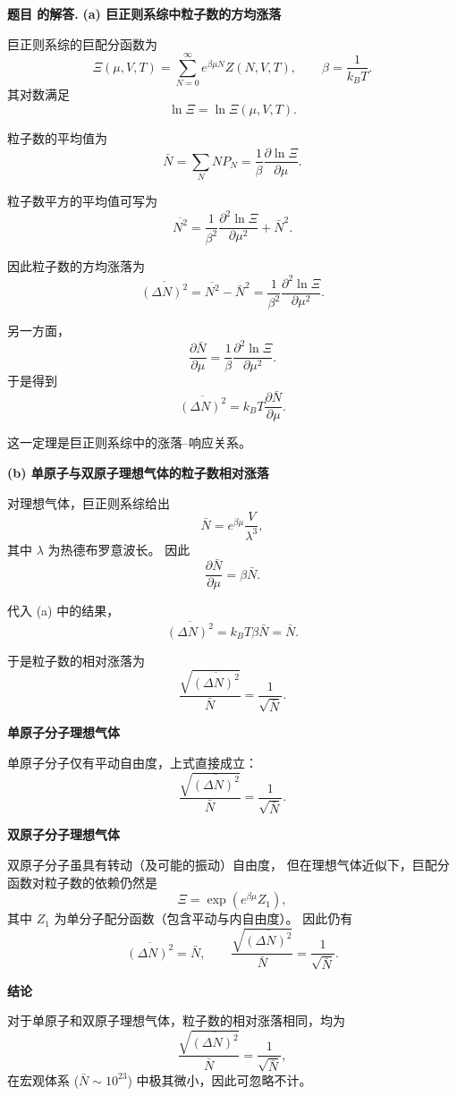 \documentclass[12pt, a4paper, oneside]{ctexart}
\newcounter{problemname}
\newenvironment{solution}
  {\par\noindent\textbf{题目 \theproblemname 的解答. }}
  {\par}
\begin{document}
\begin{solution}
  \noindent
\textbf{(a) 巨正则系综中粒子数的方均涨落}

巨正则系综的巨配分函数为
\[
\Xi(\mu,V,T)=\sum_{N=0}^{\infty} e^{\beta\mu N} Z(N,V,T),
\qquad \beta=\frac{1}{k_BT}.
\]
其对数满足
\[
\ln \Xi = \ln \Xi(\mu,V,T).
\]

粒子数的平均值为
\[
\bar N
= \sum_N N P_N
= \frac{1}{\beta}\frac{\partial \ln \Xi}{\partial \mu}.
\]

粒子数平方的平均值可写为
\[
\overline{N^2}
= \frac{1}{\beta^2}\frac{\partial^2 \ln \Xi}{\partial \mu^2}
+ \bar N^2 .
\]

因此粒子数的方均涨落为
\[
\overline{(\Delta N)^2}
= \overline{N^2}-\bar N^2
= \frac{1}{\beta^2}\frac{\partial^2 \ln \Xi}{\partial \mu^2}.
\]

另一方面，
\[
\frac{\partial \bar N}{\partial \mu}
= \frac{1}{\beta}\frac{\partial^2 \ln \Xi}{\partial \mu^2}.
\]
于是得到
\[
\boxed{
\overline{(\Delta N)^2}
= k_B T \frac{\partial \bar N}{\partial \mu}
}.
\]

这一定理是巨正则系综中的涨落–响应关系。

\bigskip
\noindent
\textbf{(b) 单原子与双原子理想气体的粒子数相对涨落}

对理想气体，巨正则系综给出
\[
\bar N = e^{\beta\mu}\frac{V}{\lambda^3},
\]
其中 $\lambda$ 为热德布罗意波长。
因此
\[
\frac{\partial \bar N}{\partial \mu}
= \beta \bar N.
\]

代入 (a) 中的结果，
\[
\overline{(\Delta N)^2}
= k_B T \beta \bar N
= \bar N.
\]

于是粒子数的相对涨落为
\[
\frac{\sqrt{\overline{(\Delta N)^2}}}{\bar N}
= \frac{1}{\sqrt{\bar N}}.
\]

\medskip
\noindent
\textbf{单原子分子理想气体}

单原子分子仅有平动自由度，上式直接成立：
\[
\boxed{
\frac{\sqrt{\overline{(\Delta N)^2}}}{\bar N}
= \frac{1}{\sqrt{\bar N}}
}.
\]

\medskip
\noindent
\textbf{双原子分子理想气体}

双原子分子虽具有转动（及可能的振动）自由度，
但在理想气体近似下，巨配分函数对粒子数的依赖仍然是
\[
\Xi=\exp\!\left(e^{\beta\mu} Z_1\right),
\]
其中 $Z_1$ 为单分子配分函数（包含平动与内自由度）。
因此仍有
\[
\overline{(\Delta N)^2}=\bar N,
\qquad
\frac{\sqrt{\overline{(\Delta N)^2}}}{\bar N}
= \frac{1}{\sqrt{\bar N}}.
\]

\bigskip
\noindent
\textbf{结论}

对于单原子和双原子理想气体，粒子数的相对涨落相同，均为
\[
\boxed{
\frac{\sqrt{\overline{(\Delta N)^2}}}{\bar N}
= \frac{1}{\sqrt{\bar N}}
},
\]
在宏观体系 ($\bar N\sim10^{23}$) 中极其微小，因此可忽略不计。
\end{solution}
\end{document}
